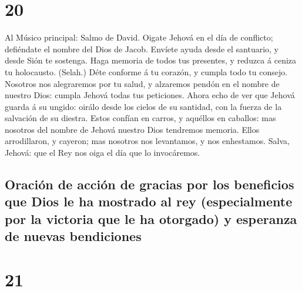 \hypertarget{section-19}{%
\section{20}\label{section-19}}

 Al Músico principal: Salmo de David. Oigate Jehová en el
día de conflicto; defiéndate el nombre del Dios de Jacob. 
Envíete ayuda desde el santuario, y desde Sión te sostenga.
 Haga memoria de todos tus presentes, y reduzca á ceniza
tu holocausto. (Selah.)  Déte conforme á tu corazón, y
cumpla todo tu consejo.  Nosotros nos alegraremos por tu
salud, y alzaremos pendón en el nombre de nuestro Dios: cumpla Jehová
todas tus peticiones.  Ahora echo de ver que Jehová guarda
á su ungido: oirálo desde los cielos de su santidad, con la fuerza de la
salvación de su diestra.  Estos confían en carros, y
aquéllos en caballos: mas nosotros del nombre de Jehová nuestro Dios
tendremos memoria.  Ellos arrodillaron, y cayeron; mas
nosotros nos levantamos, y nos enhestamos.  Salva, Jehová:
que el Rey nos oiga el día que lo invocáremos.

\hypertarget{oraciuxf3n-de-acciuxf3n-de-gracias-por-los-beneficios-que-dios-le-ha-mostrado-al-rey-especialmente-por-la-victoria-que-le-ha-otorgado-y-esperanza-de-nuevas-bendiciones}{%
\subsection{Oración de acción de gracias por los beneficios que Dios le
ha mostrado al rey (especialmente por la victoria que le ha otorgado) y
esperanza de nuevas
bendiciones}\label{oraciuxf3n-de-acciuxf3n-de-gracias-por-los-beneficios-que-dios-le-ha-mostrado-al-rey-especialmente-por-la-victoria-que-le-ha-otorgado-y-esperanza-de-nuevas-bendiciones}}

\hypertarget{section-20}{%
\section{21}\label{section-20}}

